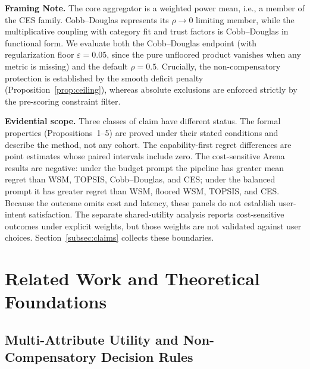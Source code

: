\documentclass[pdflatex,sn-mathphys-num]{sn-jnl}
\theoremstyle{thmstyleone}
\theoremstyle{thmstylethree}
\begin{document}
\textbf{Framing Note.} The core aggregator is a weighted power mean, i.e., a member of the CES family. Cobb--Douglas represents its $\rho \to 0$ limiting member, while the multiplicative coupling with category fit and trust factors is Cobb--Douglas in functional form. We evaluate both the Cobb--Douglas endpoint (with regularization floor $\varepsilon = 0.05$, since the pure unfloored product vanishes when any metric is missing) and the default $\rho = 0.5$. Crucially, the non-compensatory protection is established by the smooth deficit penalty (Proposition~\ref{prop:ceiling}), whereas absolute exclusions are enforced strictly by the pre-scoring constraint filter.

\textbf{Evidential scope.} Three classes of claim have different status. The formal properties (Propositions~1--5) are proved under their stated conditions and describe the method, not any cohort. The capability-first regret differences are point estimates whose paired intervals include zero. The cost-sensitive Arena results are negative: under the budget prompt the pipeline has greater mean regret than WSM, TOPSIS, Cobb--Douglas, and CES; under the balanced prompt it has greater regret than WSM, floored WSM, TOPSIS, and CES. Because the outcome omits cost and latency, these panels do not establish user-intent satisfaction. The separate shared-utility analysis reports cost-sensitive outcomes under explicit weights, but those weights are not validated against user choices. Section~\ref{subsec:claims} collects these boundaries.

\section{Related Work and Theoretical Foundations}\label{sec:related-work}

\subsection{Multi-Attribute Utility and Non-Compensatory Decision Rules}
\end{document}
